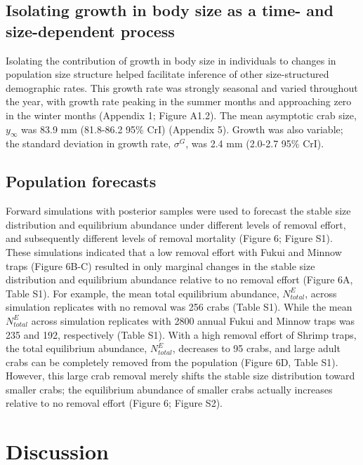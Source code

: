 \documentclass{article}
\begin{document}
\subsection{Isolating growth in body size as a time- and size-dependent process}

Isolating the contribution of growth in body size in individuals to changes in population size structure helped facilitate inference of other size-structured demographic rates. This growth rate was strongly seasonal and varied throughout the year, with growth rate peaking in the summer months and approaching zero in the winter months (Appendix 1; Figure A1.2). The mean asymptotic crab size, $y_{\infty}$ was 83.9 mm (81.8-86.2 95\% CrI) (Appendix 5). Growth was also variable; the standard deviation in growth rate, $\sigma^G$, was 2.4 mm (2.0-2.7 95\% CrI).

\subsection{Population forecasts}

Forward simulations with posterior samples were used to forecast the stable size distribution and equilibrium abundance under different levels of removal effort, and subsequently different levels of removal mortality (Figure 6; Figure S1). These simulations indicated that a low removal effort with Fukui and Minnow traps (Figure 6B-C) resulted in only marginal changes in the stable size distribution and equilibrium abundance relative to no removal effort (Figure 6A, Table S1). For example, the mean total equilibrium abundance, $N_{total}^{E}$, across simulation replicates with no removal was 256 crabs (Table S1). While the mean $N_{total}^{E}$ across simulation replicates with 2800 annual Fukui and Minnow traps was 235 and 192, respectively (Table S1). With a high removal effort of Shrimp traps, the total equilibrium abundance, $N_{total}^{E}$, decreases to 95 crabs, and large adult crabs can be completely removed from the population (Figure 6D, Table S1). However, this large crab removal merely shifts the stable size distribution toward smaller crabs; the equilibrium abundance of smaller crabs actually increases relative to no removal effort (Figure 6; Figure S2).

\section{Discussion}
\end{document}
